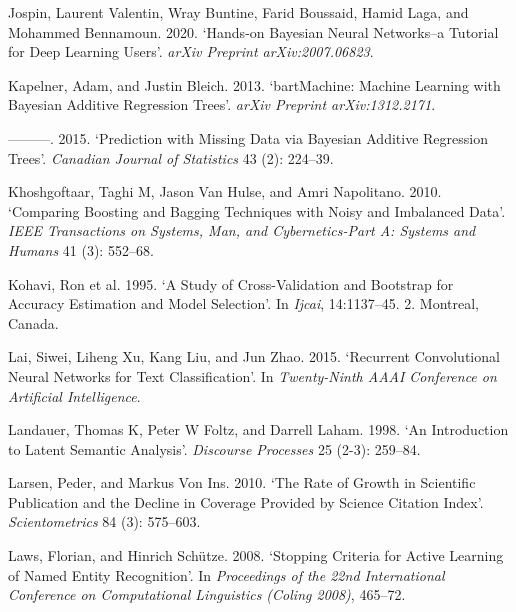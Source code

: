 \documentclass{article}
\newlength{\cslhangindent}
\newenvironment{CSLReferences}[2] %
 {%
  \setlength{\parindent}{0pt}
  \ifodd #1 \everypar{\setlength{\hangindent}{\cslhangindent}}\ignorespaces\fi
  \ifnum #2 > 0
  \setlength{\parskip}{#2\baselineskip}
  \fi
 }%
 {}
\begin{document}
\begin{CSLReferences}{1}{0}
\leavevmode{}%
Jospin, Laurent Valentin, Wray Buntine, Farid Boussaid, Hamid Laga, and
Mohammed Bennamoun. 2020. {`Hands-on Bayesian Neural Networks--a
Tutorial for Deep Learning Users'}. \emph{arXiv Preprint
arXiv:2007.06823}.

\leavevmode{}%
Kapelner, Adam, and Justin Bleich. 2013. {`bartMachine: Machine Learning
with Bayesian Additive Regression Trees'}. \emph{arXiv Preprint
arXiv:1312.2171}.

\leavevmode{}%
---------. 2015. {`Prediction with Missing Data via Bayesian Additive
Regression Trees'}. \emph{Canadian Journal of Statistics} 43 (2):
224--39.

\leavevmode{}%
Khoshgoftaar, Taghi M, Jason Van Hulse, and Amri Napolitano. 2010.
{`Comparing Boosting and Bagging Techniques with Noisy and Imbalanced
Data'}. \emph{IEEE Transactions on Systems, Man, and Cybernetics-Part A:
Systems and Humans} 41 (3): 552--68.

\leavevmode{}%
Kohavi, Ron et al. 1995. {`A Study of Cross-Validation and Bootstrap for
Accuracy Estimation and Model Selection'}. In \emph{Ijcai}, 14:1137--45.
2. Montreal, Canada.

\leavevmode{}%
Lai, Siwei, Liheng Xu, Kang Liu, and Jun Zhao. 2015. {`Recurrent
Convolutional Neural Networks for Text Classification'}. In
\emph{Twenty-Ninth AAAI Conference on Artificial Intelligence}.

\leavevmode{}%
Landauer, Thomas K, Peter W Foltz, and Darrell Laham. 1998. {`An
Introduction to Latent Semantic Analysis'}. \emph{Discourse Processes}
25 (2-3): 259--84.

\leavevmode{}%
Larsen, Peder, and Markus Von Ins. 2010. {`The Rate of Growth in
Scientific Publication and the Decline in Coverage Provided by Science
Citation Index'}. \emph{Scientometrics} 84 (3): 575--603.

\leavevmode{}%
Laws, Florian, and Hinrich Schütze. 2008. {`Stopping Criteria for Active
Learning of Named Entity Recognition'}. In \emph{Proceedings of the 22nd
International Conference on Computational Linguistics (Coling 2008)},
465--72.


\end{CSLReferences}
\end{document}
